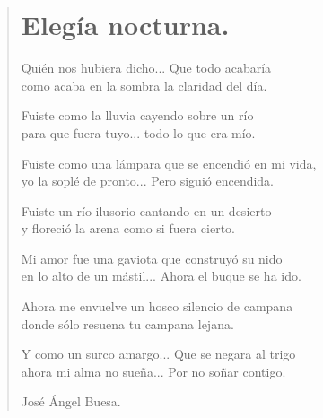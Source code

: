 \documentclass[11pt, portrait, twoside, notitlepage, openright]{book}
\begin{document}
\newpage
\begin{verse}
\begin{center}
\section{Elegía nocturna.}
\end{center}
Quién nos hubiera dicho... Que todo acabaría\\
como acaba en la sombra la claridad del día.
\newline

Fuiste como la lluvia cayendo sobre un río\\
para que fuera tuyo... todo lo que era mío.
\newline

Fuiste como una lámpara que se encendió en mi vida,\\
yo la soplé de pronto... Pero siguió encendida.
\newline

Fuiste un río ilusorio cantando en un desierto\\
y floreció la arena como si fuera cierto.
\newline

Mi amor fue una gaviota que construyó su nido\\
en lo alto de un mástil... Ahora el buque se ha ido.
\newline

Ahora me envuelve un hosco silencio de campana\\
donde sólo resuena tu campana lejana.
\newline

Y como un surco amargo... Que se negara al trigo\\
ahora mi alma no sueña... Por no soñar contigo.
\newline

José Ángel Buesa.
\end{verse}
\end{document}
